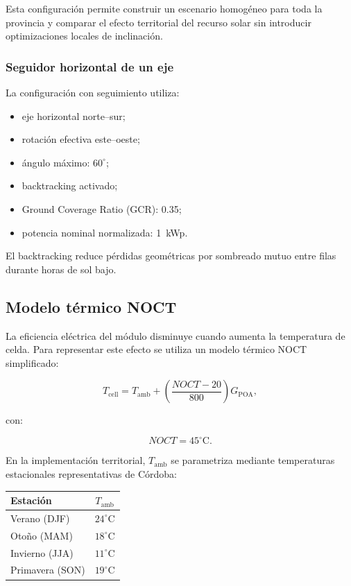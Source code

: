 \documentclass[11pt,a4paper]{article}
\begin{document}
Esta configuración permite construir un escenario homogéneo para toda la provincia y comparar el efecto territorial del recurso solar sin introducir optimizaciones locales de inclinación.

\subsubsection{Seguidor horizontal de un eje}

La configuración con seguimiento utiliza:

\begin{itemize}
    \item eje horizontal norte--sur;
    \item rotación efectiva este--oeste;
    \item ángulo máximo: $60^\circ$;
    \item backtracking activado;
    \item Ground Coverage Ratio (GCR): 0.35;
    \item potencia nominal normalizada: 1~kWp.
\end{itemize}

El backtracking reduce pérdidas geométricas por sombreado mutuo entre filas durante horas de sol bajo.

\subsection{Modelo térmico NOCT}

La eficiencia eléctrica del módulo disminuye cuando aumenta la temperatura de celda. Para representar este efecto se utiliza un modelo térmico NOCT simplificado:

\[
T_{\mathrm{cell}}
=
T_{\mathrm{amb}}
+
\left(
\frac{NOCT-20}{800}
\right)
G_{\mathrm{POA}},
\]

con:

\[
NOCT = 45^\circ\mathrm{C}.
\]

En la implementación territorial, $T_{\mathrm{amb}}$ se parametriza mediante temperaturas estacionales representativas de Córdoba:

\begin{center}
\begin{tabular}{lc}
\toprule
Estación & $T_{\mathrm{amb}}$ \\
\midrule
Verano (DJF) & $24^\circ$C \\
Otoño (MAM) & $18^\circ$C \\
Invierno (JJA) & $11^\circ$C \\
Primavera (SON) & $19^\circ$C \\
\bottomrule
\end{tabular}
\end{center}
\end{document}
